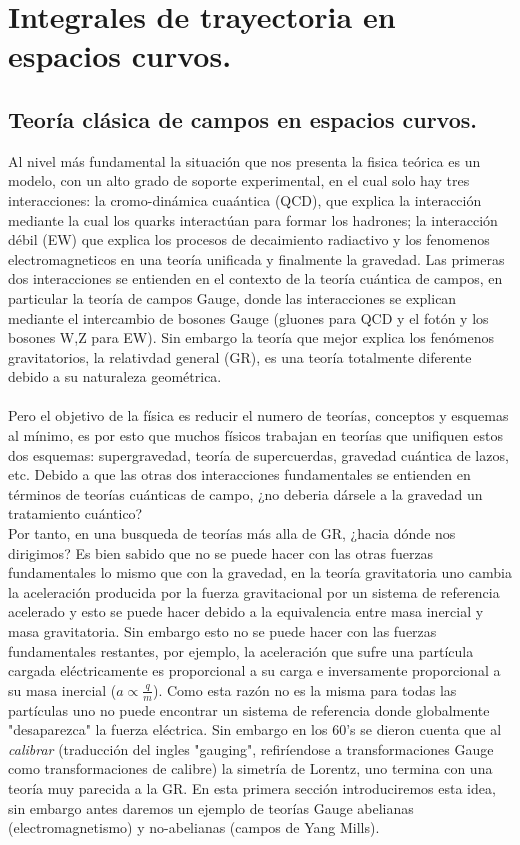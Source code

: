 \chapter{Integrales de trayectoria en espacios curvos.}


	   	
\section{Teoría clásica de campos en espacios curvos.}
Al nivel más fundamental la situación que nos presenta la fisica teórica es un modelo, con un alto grado de soporte experimental, en el cual solo hay tres interacciones: la cromo-dinámica cuaántica (QCD), que explica la interacción mediante la cual los quarks interactúan para formar los hadrones; la interacción débil (EW) que explica los procesos de decaimiento radiactivo y los fenomenos electromagneticos en una teoría unificada y finalmente la gravedad. Las primeras dos interacciones se entienden en el contexto de la teoría cuántica de campos, en particular la teoría de campos Gauge, donde las interacciones se explican mediante el intercambio de bosones Gauge (gluones para QCD y el fotón y los bosones W,Z para EW). Sin embargo la teoría que mejor explica los fenómenos gravitatorios, la relativdad general (GR), es una teoría totalmente diferente debido a su naturaleza geométrica.
\\
\\
Pero el objetivo de la física es reducir el numero de teorías, conceptos y esquemas al mínimo, es por esto que muchos físicos trabajan en teorías que unifiquen estos dos esquemas: supergravedad, teoría de supercuerdas, gravedad cuántica de lazos, etc. Debido a que las otras dos interacciones fundamentales se entienden en términos de teorías cuánticas de campo, ¿no deberia dársele a la gravedad un tratamiento cuántico?
\\
Por tanto, en una busqueda de teorías más alla de GR, ¿hacia dónde nos dirigimos? Es bien sabido que no se puede hacer con las otras fuerzas fundamentales lo mismo que con la gravedad, en la teoría gravitatoria uno cambia la aceleración producida por la fuerza gravitacional por un sistema de referencia acelerado y esto se puede hacer debido a la equivalencia entre masa inercial y masa gravitatoria. Sin embargo esto no se puede hacer con las fuerzas fundamentales restantes, por ejemplo, la aceleración que sufre una partícula cargada eléctricamente es proporcional a su carga e inversamente proporcional a su masa inercial ($a\propto \frac{q}{m}$). Como esta razón no es la misma para todas las partículas uno no puede encontrar un sistema de referencia donde globalmente "desaparezca" la fuerza eléctrica. Sin embargo en los 60's se dieron cuenta que al \textit{calibrar} (traducción del ingles "gauging", refiríendose a transformaciones Gauge como transformaciones de calibre) la simetría de Lorentz, uno termina con una teoría muy parecida a la GR. En esta primera sección introduciremos esta idea, sin embargo antes daremos un ejemplo de teorías Gauge abelianas (electromagnetismo) y no-abelianas (campos de Yang Mills).
